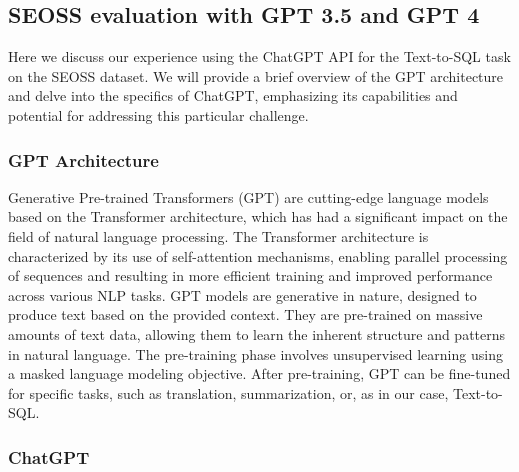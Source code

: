 \subsection{SEOSS evaluation with GPT 3.5 and GPT 4}

Here we discuss our experience using the ChatGPT API for the Text-to-SQL task on the SEOSS dataset. We will provide a brief overview of the GPT architecture and delve into the specifics of ChatGPT, emphasizing its capabilities and potential for addressing this particular challenge.
\subsubsection{GPT Architecture}
Generative Pre-trained Transformers (GPT) \cite{radford2018improving} are cutting-edge language models based on the Transformer architecture, which has had a significant impact on the field of natural language processing. The Transformer architecture is characterized by its use of self-attention mechanisms, enabling parallel processing of sequences and resulting in more efficient training and improved performance across various NLP tasks.
GPT models are generative in nature, designed to produce text based on the provided context. They are pre-trained on massive amounts of text data, allowing them to learn the inherent structure and patterns in natural language. The pre-training phase involves unsupervised learning using a masked language modeling objective. After pre-training, GPT can be fine-tuned for specific tasks, such as translation, summarization, or, as in our case, Text-to-SQL.

\subsubsection{ChatGPT}

